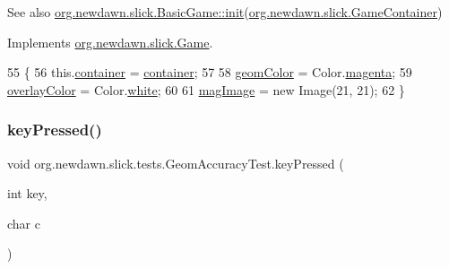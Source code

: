 \begin{DoxySeeAlso}{See also}
\mbox{\hyperlink{classorg_1_1newdawn_1_1slick_1_1_basic_game_a8af0900217e4d389249f71367b22d114}{org.\+newdawn.\+slick.\+Basic\+Game\+::init}}(\mbox{\hyperlink{classorg_1_1newdawn_1_1slick_1_1_game_container}{org.\+newdawn.\+slick.\+Game\+Container}}) 
\end{DoxySeeAlso}


Implements \mbox{\hyperlink{interfaceorg_1_1newdawn_1_1slick_1_1_game_ad2dd6affab08bb8fdb5fab0815957b7a}{org.\+newdawn.\+slick.\+Game}}.


\begin{DoxyCode}
55                                                                     \{
56         this.\mbox{\hyperlink{classorg_1_1newdawn_1_1slick_1_1tests_1_1_geom_accuracy_test_aa36ef5e207393c1e48bdc579da524cf0}{container}} = \mbox{\hyperlink{classorg_1_1newdawn_1_1slick_1_1tests_1_1_geom_accuracy_test_aa36ef5e207393c1e48bdc579da524cf0}{container}};
57         
58         \mbox{\hyperlink{classorg_1_1newdawn_1_1slick_1_1tests_1_1_geom_accuracy_test_a9e3a8cc2f12479af231295fcd97a47cc}{geomColor}} = Color.\mbox{\hyperlink{classorg_1_1newdawn_1_1slick_1_1_color_ab806bfc25e9cab954c1056a692ef6925}{magenta}};
59         \mbox{\hyperlink{classorg_1_1newdawn_1_1slick_1_1tests_1_1_geom_accuracy_test_aff160497b9c7289f4a9a7f17dbcdcdf2}{overlayColor}} = Color.\mbox{\hyperlink{classorg_1_1newdawn_1_1slick_1_1_color_afcd91cbdd26233d226d734f70dca3d2e}{white}};
60         
61         \mbox{\hyperlink{classorg_1_1newdawn_1_1slick_1_1tests_1_1_geom_accuracy_test_a29113b87453f7bebdf3ced47b8055164}{magImage}} = \textcolor{keyword}{new} Image(21, 21);
62     \}
\end{DoxyCode}
\mbox{\label{classorg_1_1newdawn_1_1slick_1_1tests_1_1_geom_accuracy_test_aa2c33ebecb488f0c0fb343a3e316c961}} 
\subsubsection{\texorpdfstring{key\+Pressed()}{keyPressed()}}
{\footnotesize\ttfamily void org.\+newdawn.\+slick.\+tests.\+Geom\+Accuracy\+Test.\+key\+Pressed (\begin{DoxyParamCaption}\item[{int}]{key,  }\item[{char}]{c }\end{DoxyParamCaption})\hspace{0.3cm}{\ttfamily [inline]}}

